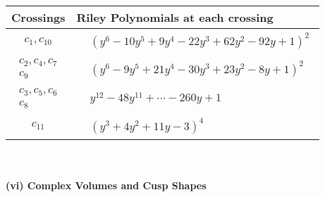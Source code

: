 \documentclass[1p]{elsarticle_modified}
\theoremstyle{definition}
\begin{document}
\begin{tabular}{m{50pt}|m{274pt}}
Crossings & \hspace{64pt}Riley Polynomials at each crossing \\
\hline $$\begin{aligned}c_{1},c_{10}\end{aligned}$$&$\begin{aligned}
&(y^6-10 y^5+9 y^4-22 y^3+62 y^2-92 y+1)^2
\end{aligned}$\\
\hline $$\begin{aligned}c_{2},c_{4},c_{7}\\c_{9}\end{aligned}$$&$\begin{aligned}
&(y^6-9 y^5+21 y^4-30 y^3+23 y^2-8 y+1)^2
\end{aligned}$\\
\hline $$\begin{aligned}c_{3},c_{5},c_{6}\\c_{8}\end{aligned}$$&$\begin{aligned}
&y^{12}-48 y^{11}+\cdots-260 y+1
\end{aligned}$\\
\hline $$\begin{aligned}c_{11}\end{aligned}$$&$\begin{aligned}
&(y^3+4 y^2+11 y-3)^4
\end{aligned}$\\
\hline
\end{tabular}\\~\\
\newpage\flushleft \textbf{(vi) Complex Volumes and Cusp Shapes}
\end{document}
